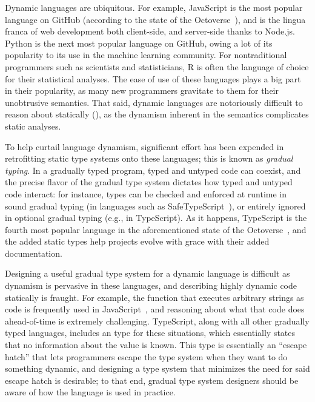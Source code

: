 \documentclass[sigplan,anonymous,review]{acmart}
\begin{document}
Dynamic languages are ubiquitous.
For example, JavaScript is the most popular language on GitHub (according to the state of the Octoverse~\cite{state-of-octoverse-2021}), and is the lingua franca of web development both client-side, and server-side thanks to Node.js.
Python is the next most popular language on GitHub, owing a lot of its popularity to its use in the machine learning community.
For nontraditional programmers such as scientists and statisticians, R is often the language of choice for their statistical analyses.
The ease of use of these languages plays a big part in their popularity, as many new programmers gravitate to them for their unobtrusive semantics.
That said, dynamic languages are notoriously difficult to reason about statically (), as the dynamism inherent in the semantics complicates static analyses.

To help curtail language dynamism, significant effort has been expended in retrofitting static type systems onto these languages; this is known as \textit{gradual typing}.
In a gradually typed program, typed and untyped code can coexist, and the precise flavor of the gradual type system dictates how typed and untyped code interact: for instance, types can be checked and enforced at runtime in sound gradual typing (in languages such as SafeTypeScript~\cite{rastogi2015safe}), or entirely ignored in optional gradual typing (e.g., in TypeScript).
As it happens, TypeScript is the fourth most popular language in the aforementioned state of the Octoverse~\cite{state-of-octoverse-2021}, and the added static types help projects evolve with grace with their added documentation.

Designing a useful gradual type system for a dynamic language is difficult as dynamism is pervasive in these languages, and describing highly dynamic code statically is fraught.
For example, the  function that executes arbitrary strings as code is frequently used in JavaScript~\cite{richards2011eval}, and reasoning about what that code does ahead-of-time is extremely challenging.
TypeScript, along with all other gradually typed languages, includes an  type for these situations, which essentially states that no information about the value is known.
This  type is essentially an ``escape hatch'' that lets programmers escape the type system when they want to do something dynamic, and designing a type system that minimizes the need for said escape hatch is desirable; to that end, gradual type system designers should be aware of how the language is used in practice. %
\end{document}
